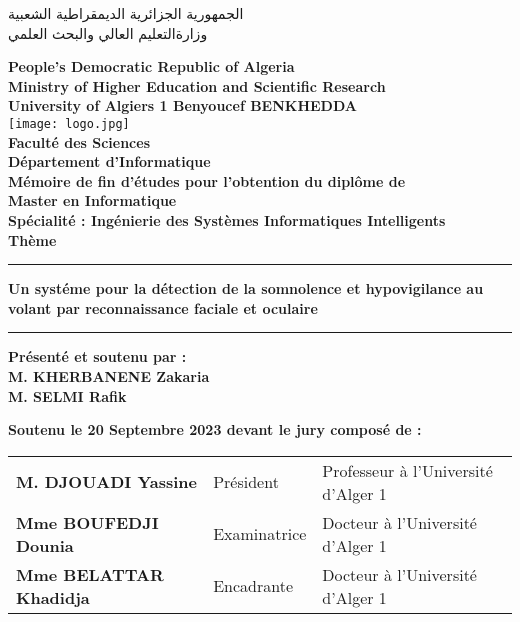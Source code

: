 \thispagestyle{empty}
\begin{arabtex}
\par\noindent
\small
\begin{center}
الجمهورية الجزائرية الديمقراطية الشعبية \\ وزارةالتعليم العالي والبحث العلمي  
\end{center}
\end{arabtex}
\begin{center}
	\textbf{People’s Democratic Republic of Algeria} \\
	\textbf{Ministry of Higher Education and Scientific Research} \\
	\textbf{University of Algiers 1 Benyoucef BENKHEDDA}\\

	\texttt{[image: logo.jpg]}\\

	\textbf{Faculté des Sciences} \\
	\textbf{Département d'Informatique}\\
	\textbf{Mémoire de fin d’études pour l’obtention du diplôme de\\ Master en Informatique} \\
	\textbf{Spécialité : Ingénierie des Systèmes Informatiques Intelligents}\\

	
	\textbf{{\large{Thème}}}
	\vspace{0.125cm}\noindent
	\rule{\textwidth}{2pt} 
	\Large\bf{Un systéme pour la détection de la somnolence et hypovigilance au volant par reconnaissance faciale et oculaire} 
\end{center}
\noindent
  \rule{\textwidth}{2pt}
\vspace{0.1cm}
\par
\begin{center}
\textbf{Présenté et soutenu par :} \\
	\textbf{M. KHERBANENE Zakaria}\\
	\textbf{M. SELMI Rafik}
	\vspace{0.5cm}
	\par
 \end{center}
{\bf Soutenu le 20 Septembre 2023 devant le jury composé de : } 
\begin{center}
\vspace{0.1cm}
	\begin{tabular}{lll}
		\bf M.  DJOUADI Yassine & Président &  Professeur à l'Université d'Alger 1   \\
		\bf Mme BOUFEDJI Dounia & Examinatrice & Docteur à l'Université d'Alger 1    \\
        \bf Mme BELATTAR Khadidja & Encadrante & Docteur à l'Université d'Alger 1   \\
	\end{tabular}


\vspace{2.0 cm}
\par

\end{center}